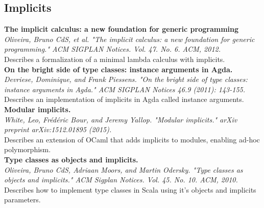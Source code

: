 \documentclass[12pt]{article}
\begin{document}
\subsection{Implicits}
\textbf{The implicit calculus: a new foundation for generic programming} \\
\textit{Oliveira, Bruno CdS, et al. "The implicit calculus: a new foundation for generic programming." ACM SIGPLAN Notices. Vol. 47. No. 6. ACM, 2012.} \\
Describes a formalization of a minimal lambda calculus with implicits.
\\
\textbf{On the bright side of type classes: instance arguments in Agda.} \\
\textit{Devriese, Dominique, and Frank Piessens. "On the bright side of type classes: instance arguments in Agda." ACM SIGPLAN Notices 46.9 (2011): 143-155.} \\
Describes an implementation of implicits in Agda called instance arguments.
\\
\textbf{Modular implicits.} \\
\textit{White, Leo, Frédéric Bour, and Jeremy Yallop. "Modular implicits." arXiv preprint arXiv:1512.01895 (2015).} \\
Describes an extension of OCaml that adds implicits to modules, enabling ad-hoc polymorphism. 
\\
\textbf{Type classes as objects and implicits.} \\
\textit{Oliveira, Bruno CdS, Adriaan Moors, and Martin Odersky. "Type classes as objects and implicits." ACM Sigplan Notices. Vol. 45. No. 10. ACM, 2010.} \\
Describes how to implement type classes in Scala using it's objects and implicits parameters.
\end{document}
